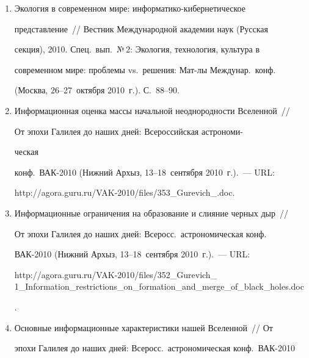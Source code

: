 \begin{enumerate}[1.]
С.~140--143.





\item {}


Экология в современном мире: информатико-ки\-бер\-не\-ти\-че\-ское 


представление~/\!\!/  Вестник Международной академии наук (Русская 


секция), 2010. Спец.\ вып.\ №\,2: Экология, технология, культура в 


современном мире: проблемы vs.\ решения: Мат-лы Междунар.\ конф.\ 


(Москва, 26--27~октября 2010~г.). С.~88--90.


\item {}


Информационная оценка массы начальной неоднородности Вселенной~/\!\!/  


От эпохи Галилея до наших дней: Всероссийская астрономи-\linebreak\vspace*{-12pt}


\pagebreak





\noindent


ческая 


конф.\  ВАК-2010 (Нижний Архыз, 13--18~сентября 2010~г.).~--- URL: 


{\sf http://agora.guru.ru/VAK-2010/files/353\_Gurevich\_.doc}.


\item {}


Информационные ограничения на образование и слияние черных дыр~/\!\!/  


От эпохи Галилея до наших дней: Всеросс.\ астрономическая конф.\  


ВАК-2010 (Нижний Архыз, 13--18~сен\-тяб\-ря 2010~г.).~--- URL: {\sf 


http://agora.guru.ru/VAK-2010/files/352\_Gurevich\_ 1\_Information\_restrictions\_on\_formation\_and\_merge\_of\_black\_holes.doc}.


\item {}


Основные информационные характеристики нашей Вселенной~/\!\!/  От 


эпохи Галилея до наших дней: Всеросс.\ астрономическая конф.\ ВАК-2010 



\end{enumerate}
